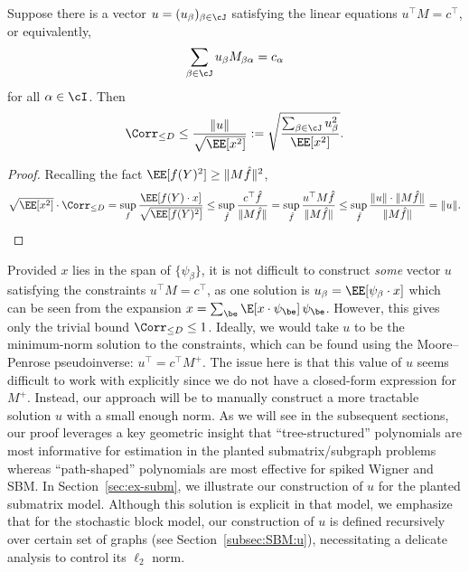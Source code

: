 \documentclass[11pt]{article}
\begin{document}
\begin{proposition}
\label{prop:master}
Suppose there is a vector $u = (u_\beta)_{\beta \in \cJ}$ satisfying the linear equations $u^\top M = c^\top$, or equivalently,
\begin{equation}\label{eq:u-cond}
\sum_{\beta \in \cJ} u_\beta M_{\beta\alpha} = c_\alpha
\end{equation}
for all $\alpha \in \cI$. Then
\[ \Corr_{\le D} \le \frac{\|u\|}{\sqrt{\EE[x^2]}} := \sqrt{\frac{\sum_{\beta \in \cJ} u_\beta^2}{\EE[x^2]}}. \]
\end{proposition}

\begin{proof}
Recalling the fact $\EE[f(Y)^2] \ge \|M\hat{f}\|^2$,
\[ \sqrt{\EE[x^2]} \cdot \Corr_{\le D} = \sup_f \frac{\EE[f(Y) \cdot x]}{\sqrt{\EE[f(Y)^2]}} \le \sup_{\hat f} \frac{c^\top \hat f}{\|M \hat f\|} = \sup_{\hat f} \frac{u^\top M \hat f}{\|M \hat f\|} \le \sup_{\hat f} \frac{\|u\| \cdot \|M \hat f\|}{\|M \hat f\|} = \|u\|. \]
\end{proof}

Provided $x$ lies in the span of $\{\psi_\beta\}$, it is not difficult to construct \emph{some} vector $u$ satisfying the constraints $u^\top M = c^\top$, as one solution is $u_\beta = \EE[\psi_\beta \cdot x]$ which can be seen from the expansion $x = \sum_{\be} \E[x \cdot \psi_{\be}] \, \psi_{\be}$. However, this gives only the trivial bound $\Corr_{\le D} \le 1$. Ideally, we would take $u$ to be the minimum-norm solution to the constraints, which can be found using the Moore--Penrose pseudoinverse: $u^\top = c^\top M^+$. The issue here is that this value of $u$ seems difficult to work with explicitly since we do not have a closed-form expression for $M^+$. Instead, our approach will be to manually construct a more tractable solution $u$ with a small enough norm. As we will see in the subsequent sections, our proof leverages a key geometric insight that ``tree-structured'' polynomials are most informative for estimation in the planted submatrix/subgraph problems whereas ``path-shaped'' polynomials are most effective for spiked Wigner and SBM.  In Section~\ref{sec:ex-subm}, we illustrate our construction of $u$ for the planted submatrix model. Although this solution is explicit in that model, we emphasize that for the stochastic block model, our construction of $u$ is defined recursively over certain set of graphs (see Section~\ref{subsec:SBM:u}), necessitating a delicate analysis to control its $\ell_2$ norm.
\end{document}
